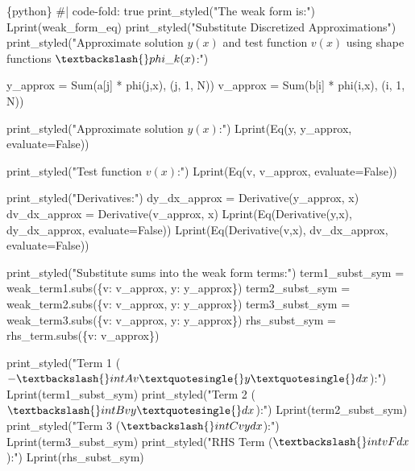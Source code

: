 \documentclass[
  11pt,
  a4paper,
]{scrbook}
\newenvironment{Shaded}{\begin{snugshade}}{\end{snugshade}}
\newcommand{\InformationTok}[1]{\textcolor[rgb]{0.37,0.37,0.37}{#1}}
\begin{document}
\begin{Shaded}
\begin{Highlighting}[]
\InformationTok{\textasciigrave{}\textasciigrave{}\textasciigrave{}\{python\}}
\InformationTok{\#| code{-}fold: true}
\InformationTok{print\_styled("The weak form is:")}
\InformationTok{Lprint(weak\_form\_eq)}
\InformationTok{print\_styled("Substitute Discretized Approximations")}
\InformationTok{print\_styled("Approximate solution $y(x)$ and test function $v(x)$ using shape functions $\textbackslash{}phi\_k(x)$:")}

\InformationTok{y\_approx = Sum(a[j] * phi(j,x), (j, 1, N))}
\InformationTok{v\_approx = Sum(b[i] * phi(i,x), (i, 1, N))}

\InformationTok{print\_styled("Approximate solution $y(x)$:")}
\InformationTok{Lprint(Eq(y, y\_approx, evaluate=False))}

\InformationTok{print\_styled("Test function $v(x)$:")}
\InformationTok{Lprint(Eq(v, v\_approx, evaluate=False))}

\InformationTok{print\_styled("Derivatives:")}
\InformationTok{dy\_dx\_approx = Derivative(y\_approx, x)}
\InformationTok{dv\_dx\_approx = Derivative(v\_approx, x)}
\InformationTok{Lprint(Eq(Derivative(y,x), dy\_dx\_approx, evaluate=False))}
\InformationTok{Lprint(Eq(Derivative(v,x), dv\_dx\_approx, evaluate=False))}

\InformationTok{print\_styled("Substitute sums into the weak form terms:")}
\InformationTok{term1\_subst\_sym = weak\_term1.subs(\{v: v\_approx, y: y\_approx\})}
\InformationTok{term2\_subst\_sym = weak\_term2.subs(\{v: v\_approx, y: y\_approx\})}
\InformationTok{term3\_subst\_sym = weak\_term3.subs(\{v: v\_approx, y: y\_approx\})}
\InformationTok{rhs\_subst\_sym = rhs\_term.subs(\{v: v\_approx\})}

\InformationTok{print\_styled("Term 1 (${-}\textbackslash{}int A v\textquotesingle{} y\textquotesingle{} dx$):")}
\InformationTok{Lprint(term1\_subst\_sym)}
\InformationTok{print\_styled("Term 2 ($\textbackslash{}int B v y\textquotesingle{} dx$):")}
\InformationTok{Lprint(term2\_subst\_sym)}
\InformationTok{print\_styled("Term 3 ($\textbackslash{}int C v y dx$):")}
\InformationTok{Lprint(term3\_subst\_sym)}
\InformationTok{print\_styled("RHS Term ($\textbackslash{}int v F dx$):")}
\InformationTok{Lprint(rhs\_subst\_sym)}
\InformationTok{\textasciigrave{}\textasciigrave{}\textasciigrave{}}
\end{Highlighting}
\end{Shaded}
\end{document}
